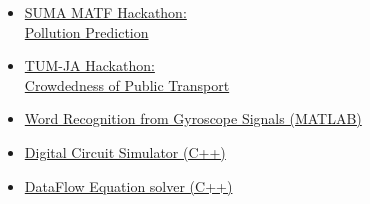    \begin{itemize}
        \item \href{https://github.com/basicskill/matf-hackathon}{SUMA MATF Hackathon: \\Pollution Prediction}
        \item \href{https://github.com/basicskill/tum-hackathon}{TUM-JA Hackathon: \\Crowdedness of Public Transport}

        \item \href{https://esveske.github.io/pdf/2016/PFE1605.pdf}{Word Recognition from Gyroscope Signals (MATLAB)}
        \item \href{https://github.com/basicskill/OOP}{Digital Circuit Simulator (C++)}
        \item \href{https://github.com/basicskill/OOP}{DataFlow Equation solver (C++)}
    \end{itemize}

    
    
